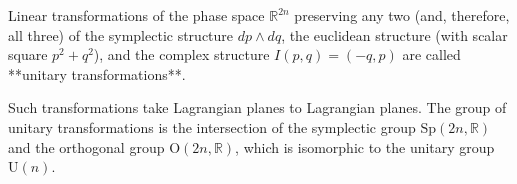 Linear transformations of the phase space $\mathbb{R}^{2n}$ preserving any two (and, therefore, all three) of the symplectic structure $dp \wedge dq$, the euclidean structure (with scalar square $p^2 + q^2$), and the complex structure $I(p,q) = (-q,p)$ are called **unitary transformations**.

Such transformations take Lagrangian planes to Lagrangian planes. The group of unitary transformations is the intersection of the symplectic group $\mathrm{Sp}(2n, \mathbb{R})$ and the orthogonal group $\mathrm{O}(2n, \mathbb{R})$, which is isomorphic to the unitary group $\mathrm{U}(n)$.
